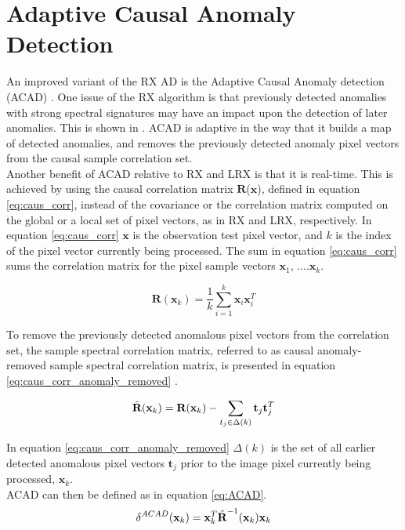 \section{Adaptive Causal Anomaly Detection}
An improved variant of the RX AD is the Adaptive Causal Anomaly detection (ACAD) \cite{chang2006characterization}. One issue of the RX algorithm is that previously detected anomalies with strong spectral signatures may have an impact upon the detection of later anomalies. This is shown in \cite{chang2006characterization}. ACAD is adaptive in the way that it builds a map of detected anomalies, and removes the previously detected anomaly pixel vectors from the causal sample correlation set. \\
Another benefit of ACAD relative to RX and LRX is that it is real-time. This is achieved by using the causal correlation matrix $\textbf{R}$($\textbf{x}$), defined in equation \ref{eq:caus_corr}, instead of the covariance or the correlation matrix computed on the global or a local set of pixel vectors, as in RX and LRX, respectively. In equation \ref{eq:caus_corr} $\textbf{x}$ is the observation test pixel vector, and $k$ is the index of the pixel vector currently being processed. The sum in equation \ref{eq:caus_corr} sums the correlation matrix for the pixel sample vectors {$\textbf{x}_1$, ....$\textbf{x}_k$}.  

\begin{equation}
    \textbf{R}(\textbf{x}_k)=\frac{1}{k}\sum_{i=1}^k\textbf{x}_i\textbf{x}_i^T
    \label{eq:caus_corr}
\end{equation}

To remove the previously detected anomalous pixel vectors from the correlation set, the sample spectral correlation matrix, referred to as causal anomaly-removed sample spectral correlation matrix, is presented in equation \ref{eq:caus_corr_anomaly_removed} \cite{chang2006characterization}.

\begin{equation}
    \Tilde{\textbf{R}}(\textbf{x}_k)= \textbf{R}(\textbf{x}_k) - \sum_{t_j\in\Delta(k)}\textbf{t}_j\textbf{t}_j^T
    \label{eq:caus_corr_anomaly_removed}
\end{equation}

In equation \ref{eq:caus_corr_anomaly_removed} $\Delta(k)$ is the set of all earlier detected anomalous pixel vectors $\textbf{t}_j$ prior to the image pixel currently being processed, $\textbf{x}_k$.
\\
ACAD can then be defined as in equation \ref{eq:ACAD}.
\begin{equation}
    \delta^{ACAD}(\textbf{x}_k)= \textbf{x}_k^T\Tilde{\textbf{R}}^{-1}(\textbf{x}_k)\textbf{x}_k
    \label{eq:ACAD}
\end{equation}

